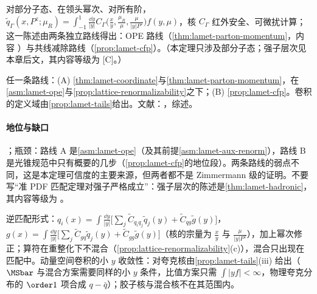 \begin{theorem}\label{thm:lattice-lamet}
对部分子态、在领头幂次、对所有阶，$\tilde q_\Gamma(x,P^z;\mu_R)=\int_{-1}^1\frac{\dd y}{|y|}C_\Gamma\big(\frac xy,\frac{\mu_R}\mu,\frac\mu{|y|P^z}\big)f(y,\mu)$，核 $C_\Gamma$ 红外安全、可微扰计算；这一陈述由两条独立路线得出：OPE 路线（\cref{thm:lamet-parton-momentum}，内容 \tagA）与共线减除路线（\cref{prop:lamet-cfp}）。（本定理只涉及部分子态；强子层次见本章后文，其内容等级为 [C]。）
\end{theorem}

\begin{proofsketch}
任一条路线：(A) \cref{thm:lamet-coordinate}与\cref{thm:lamet-parton-momentum}，在\cref{asm:lamet-ope}与\cref{prop:lattice-renormalizability}之下；(B) \cref{prop:lamet-cfp}。卷积的定义域由\cref{prop:lamet-tails}给出。文献：\cite{IzubuchiEtAl2018,Ma:2014jla,MaQiu2018,JiEtAl2021}，综述\cite{Constantinou:2020hdm}。
\end{proofsketch}

\paragraph{地位与缺口}
\tagA；瓶颈：路线 A 是\cref{asm:lamet-ope}（及其前提\cref{asm:lamet-aux-renorm}），路线 B 是光锥规范中只有概要的几步（\cref{prop:lamet-cfp}的地位段）。两条路线的弱点不同，这是本定理可信度的主要来源，但两者都不是 Zimmermann 级的证明。不要写“准 PDF 匹配定理对强子严格成立”：强子层次的陈述是\cref{thm:lamet-hadronic}，其内容等级为 \tagC。

\begin{proposition}\label{prop:lamet-gluon-singlet}
逆匹配形式\cite{JiEtAl2021}：$q_i(x)=\int\frac{\dd y}{|y|}\big[\sum_j\tilde C_{q_iq_j}\tilde q_j(y)+\tilde C_{qg}\tilde g(y)\big]$，$g(x)=\int\frac{\dd y}{|y|}\big[\sum_j\tilde C_{gq}\tilde q_j(y)+\tilde C_{gg}\tilde g(y)\big]$（核的宗量为 $\frac xy$ 与 $\frac\mu{|y|P^z}$），加上幂次修正；算符在重整化下不混合（\cref{prop:lattice-renormalizability}(c)），混合只出现在匹配中。动量空间卷积的小 $y$ 收敛性：对夸克核由\cref{prop:lamet-tails}(iii) 给出（$\MSbar$ 与混合方案需要同样的小 $y$ 条件，比值方案只需 $\int|yf|<\infty$，物理夸克分布的 $\order1$ 项合成 $q-\bar q$）；胶子核与混合核不在其范围内。
\end{proposition}

